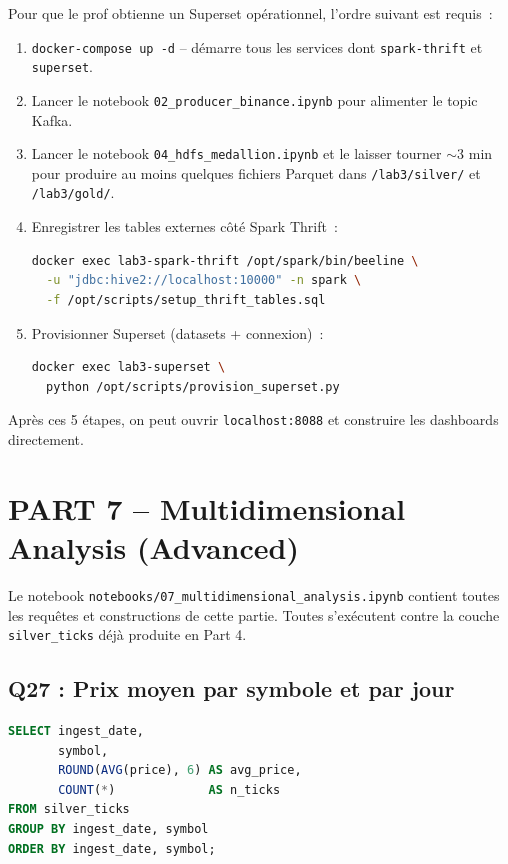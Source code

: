 \documentclass{RapportINPTCLOUD}
\begin{document}
Pour que le prof obtienne un Superset op\'{e}rationnel, l'ordre suivant est requis~:
\begin{enumerate}[leftmargin=2em]
    \item \texttt{docker-compose up -d} -- d\'{e}marre tous les services dont \texttt{spark-thrift} et \texttt{superset}.
    \item Lancer le notebook \texttt{02\_producer\_binance.ipynb} pour alimenter le topic Kafka.
    \item Lancer le notebook \texttt{04\_hdfs\_medallion.ipynb} et le laisser tourner $\sim$3 min pour produire au moins quelques fichiers Parquet dans \texttt{/lab3/silver/} et \texttt{/lab3/gold/}.
    \item Enregistrer les tables externes c\^{o}t\'{e} Spark Thrift~:
\begin{lstlisting}[style=code, language=bash]
docker exec lab3-spark-thrift /opt/spark/bin/beeline \
  -u "jdbc:hive2://localhost:10000" -n spark \
  -f /opt/scripts/setup_thrift_tables.sql
\end{lstlisting}
    \item Provisionner Superset (datasets + connexion)~:
\begin{lstlisting}[style=code, language=bash]
docker exec lab3-superset \
  python /opt/scripts/provision_superset.py
\end{lstlisting}
\end{enumerate}
Apr\`{e}s ces 5 \'{e}tapes, on peut ouvrir \texttt{localhost:8088} et construire les dashboards directement.

\section{PART 7 -- Multidimensional Analysis (Advanced)}

Le notebook \texttt{notebooks/07\_multidimensional\_analysis.ipynb} contient toutes les requ\^{e}tes et constructions de cette partie. Toutes s'ex\'{e}cutent contre la couche \texttt{silver\_ticks} d\'{e}j\`{a} produite en Part 4.

\subsection{Q27 : Prix moyen par symbole et par jour}

\begin{lstlisting}[style=code, language=SQL]
SELECT ingest_date,
       symbol,
       ROUND(AVG(price), 6) AS avg_price,
       COUNT(*)             AS n_ticks
FROM silver_ticks
GROUP BY ingest_date, symbol
ORDER BY ingest_date, symbol;
\end{lstlisting}
\end{document}
